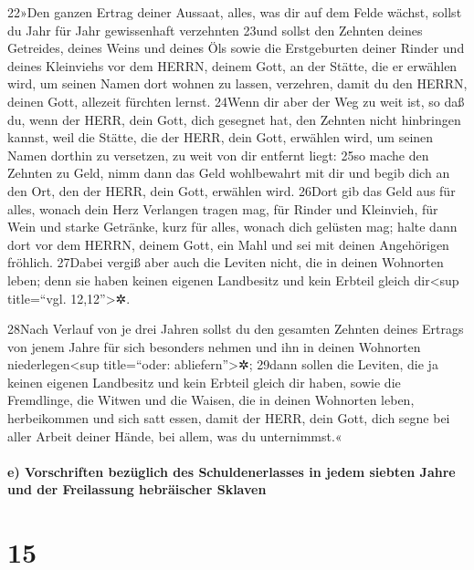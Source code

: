22»Den ganzen Ertrag deiner Aussaat, alles, was dir auf dem Felde
wächst, sollst du Jahr für Jahr gewissenhaft verzehnten 23und sollst den
Zehnten deines Getreides, deines Weins und deines Öls sowie die
Erstgeburten deiner Rinder und deines Kleinviehs vor dem HERRN, deinem
Gott, an der Stätte, die er erwählen wird, um seinen Namen dort wohnen
zu lassen, verzehren, damit du den HERRN, deinen Gott, allezeit fürchten
lernst. 24Wenn dir aber der Weg zu weit ist, so daß du, wenn der HERR,
dein Gott, dich gesegnet hat, den Zehnten nicht hinbringen kannst, weil
die Stätte, die der HERR, dein Gott, erwählen wird, um seinen Namen
dorthin zu versetzen, zu weit von dir entfernt liegt: 25so mache den
Zehnten zu Geld, nimm dann das Geld wohlbewahrt mit dir und begib dich
an den Ort, den der HERR, dein Gott, erwählen wird. 26Dort gib das Geld
aus für alles, wonach dein Herz Verlangen tragen mag, für Rinder und
Kleinvieh, für Wein und starke Getränke, kurz für alles, wonach dich
gelüsten mag; halte dann dort vor dem HERRN, deinem Gott, ein Mahl und
sei mit deinen Angehörigen fröhlich. 27Dabei vergiß aber auch die
Leviten nicht, die in deinen Wohnorten leben; denn sie haben keinen
eigenen Landbesitz und kein Erbteil gleich dir\textless sup title=``vgl.
12,12''\textgreater✲.

28Nach Verlauf von je drei Jahren sollst du den gesamten Zehnten deines
Ertrags von jenem Jahre für sich besonders nehmen und ihn in deinen
Wohnorten niederlegen\textless sup title=``oder:
abliefern''\textgreater✲; 29dann sollen die Leviten, die ja keinen
eigenen Landbesitz und kein Erbteil gleich dir haben, sowie die
Fremdlinge, die Witwen und die Waisen, die in deinen Wohnorten leben,
herbeikommen und sich satt essen, damit der HERR, dein Gott, dich segne
bei aller Arbeit deiner Hände, bei allem, was du unternimmst.«

\hypertarget{e-vorschriften-bezuxfcglich-des-schuldenerlasses-in-jedem-siebten-jahre-und-der-freilassung-hebruxe4ischer-sklaven}{%
\paragraph{e) Vorschriften bezüglich des Schuldenerlasses in jedem
siebten Jahre und der Freilassung hebräischer
Sklaven}\label{e-vorschriften-bezuxfcglich-des-schuldenerlasses-in-jedem-siebten-jahre-und-der-freilassung-hebruxe4ischer-sklaven}}

\hypertarget{section-14}{%
\section{15}\label{section-14}}

